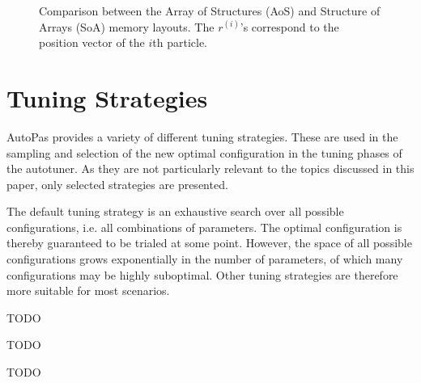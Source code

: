 \begin{figure}[htpb]
\begin{center}
	\end{center}
	\caption{Comparison between the Array of Structures (AoS) and Structure of Arrays (SoA) memory layouts. The $r^{(i)}$'s correspond to the position vector of the $i$th particle.}
	\label{fig:aos_soa}
\end{figure}

\section{Tuning Strategies}
\label{sec:tuning_strategies}

AutoPas provides a variety of different tuning strategies. These are used in the sampling and selection of the new optimal configuration in the tuning phases of the autotuner. As they are not particularly relevant to the topics discussed in this paper, only selected strategies are presented.
\begin{description}[leftmargin=!,labelwidth=\widthof{\textbf{PredictiveTuning }}]
	\item[\textbf{FullSearch}] The default tuning strategy is an exhaustive search over all possible configurations, i.e. all combinations of parameters. The optimal configuration is thereby guaranteed to be trialed at some point. However, the space of all possible configurations grows exponentially in the number of parameters, of which many configurations may be highly suboptimal. Other tuning strategies are therefore more suitable for most scenarios.
	\item[\textbf{PredictiveTuning}] TODO
	\item[\textbf{FuzzyTuning}] TODO \cite{Lerchner2024}
	\item[\textbf{SlowConfigFilter}] TODO
\end{description}

